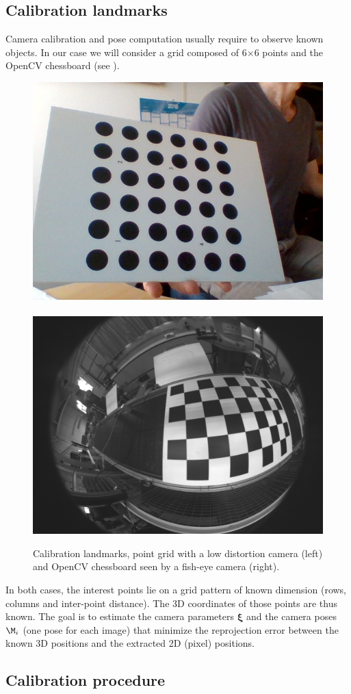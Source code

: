 \documentclass{ecnreport}
\begin{document}
\subsection{Calibration landmarks}

Camera calibration and pose computation usually require to observe known objects. In our case we will consider a grid composed of 6$\times$6 points and
the OpenCV chessboard (see ).

\begin{figure}[h!]
 \includegraphics[width=.45\linewidth]{grid} ~~\includegraphics[width=.45\linewidth]{chessboard}
 \caption{Calibration landmarks, point grid with a low distortion camera (left) and OpenCV chessboard seen by a fish-eye camera (right).}
 \label{fig:landmarks}
\end{figure}

\newcommand{\xii}{{\boldsymbol{\xi}}}

In both cases, the interest points lie on a grid pattern of known dimension (rows, columns and inter-point distance). The 3D coordinates of those points
are thus known. The goal is to estimate the camera parameters $\xii$ and the camera poses $\M_i$ (one pose for each image) that minimize the reprojection error between the known 3D positions
and the extracted 2D (pixel) positions.

\subsection{Calibration procedure}
\label{sec:calib}
\end{document}
